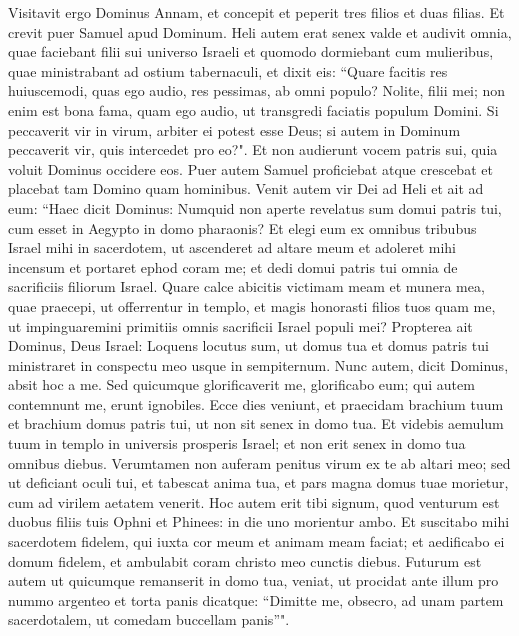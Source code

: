 \begin{biblechapter}
\verse Visitavit ergo Dominus Annam, et concepit et peperit tres filios et duas filias. Et crevit puer Samuel apud Dominum. 
\verse Heli autem erat senex valde et audivit omnia, quae faciebant filii sui universo Israeli et quomodo dormiebant cum mulieribus, quae ministrabant ad ostium tabernaculi, 
\verse et dixit eis: “Quare facitis res huiuscemodi, quas ego audio, res pessimas, ab omni populo? 
\verse Nolite, filii mei; non enim est bona fama, quam ego audio, ut transgredi faciatis populum Domini. 
\verse Si peccaverit vir in virum, arbiter ei potest esse Deus; si autem in Dominum peccaverit vir, quis intercedet pro eo?". Et non audierunt vocem patris sui, quia voluit Dominus occidere eos. 
\verse Puer autem Samuel proficiebat atque crescebat et placebat tam Domino quam hominibus. 
\verse Venit autem vir Dei ad Heli et ait ad eum: “Haec dicit Dominus: Numquid non aperte revelatus sum domui patris tui, cum esset in Aegypto in domo pharaonis?  
\verse Et elegi eum ex omnibus tribubus Israel mihi in sacerdotem, ut ascenderet ad altare meum et adoleret mihi incensum et portaret ephod coram me; et dedi domui patris tui omnia de sacrificiis filiorum Israel. 
\verse Quare calce abicitis victimam meam et munera mea, quae praecepi, ut offerrentur in templo, et magis honorasti filios tuos quam me, ut impinguaremini primitiis omnis sacrificii Israel populi mei? 
\verse Propterea ait Dominus, Deus Israel: Loquens locutus sum, ut domus tua et domus patris tui ministraret in conspectu meo usque in sempiternum. Nunc autem, dicit Dominus, absit hoc a me. Sed quicumque glorificaverit me, glorificabo eum; qui autem contemnunt me, erunt ignobiles. 
\verse Ecce dies veniunt, et praecidam brachium tuum et brachium domus patris tui, ut non sit senex in domo tua. 
\verse Et videbis aemulum tuum in templo in universis prosperis Israel; et non erit senex in domo tua omnibus diebus. 
\verse Verumtamen non auferam penitus virum ex te ab altari meo; sed ut deficiant oculi tui, et tabescat anima tua, et pars magna domus tuae morietur, cum ad virilem aetatem venerit. 
\verse Hoc autem erit tibi signum, quod venturum est duobus filiis tuis Ophni et Phinees: in die uno morientur ambo. 
\verse Et suscitabo mihi sacerdotem fidelem, qui iuxta cor meum et animam meam faciat; et aedificabo ei domum fidelem, et ambulabit coram christo meo cunctis diebus. 
\verse Futurum est autem ut quicumque remanserit in domo tua, veniat, ut procidat ante illum pro nummo argenteo et torta panis dicatque: “Dimitte me, obsecro, ad unam partem sacerdotalem, ut comedam buccellam panis”". 
\end{biblechapter}

